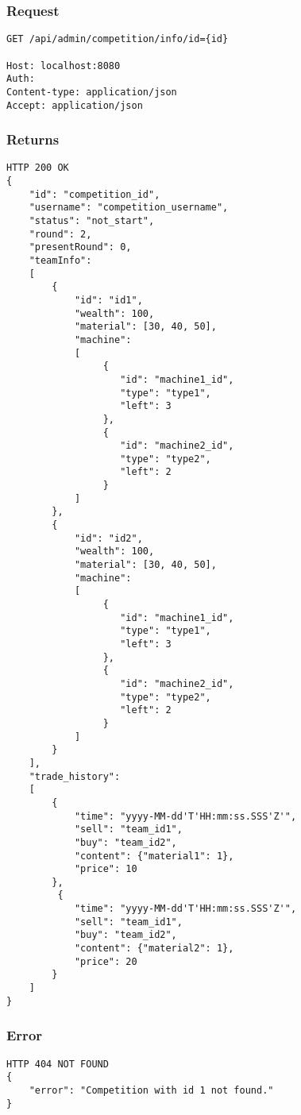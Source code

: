 \documentclass{article}
\begin{document}
\subsubsection*{Request}
\begin{lstlisting}
GET /api/admin/competition/info/id={id}

Host: localhost:8080
Auth:
Content-type: application/json
Accept: application/json
\end{lstlisting}

\subsubsection*{Returns}
\begin{lstlisting}
HTTP 200 OK
{
    "id": "competition_id",
    "username": "competition_username",
    "status": "not_start",
    "round": 2,
    "presentRound": 0,
    "teamInfo":
    [
        {
            "id": "id1",
            "wealth": 100,
            "material": [30, 40, 50],
            "machine":
            [
                 {
                    "id": "machine1_id",
                    "type": "type1",
                    "left": 3
                 },
                 {
                    "id": "machine2_id",
                    "type": "type2",
                    "left": 2
                 }
            ]
        },
        {
            "id": "id2",
            "wealth": 100,
            "material": [30, 40, 50],
            "machine":
            [
                 {
                    "id": "machine1_id",
                    "type": "type1",
                    "left": 3
                 },
                 {
                    "id": "machine2_id",
                    "type": "type2",
                    "left": 2
                 }
            ]
        }
    ],
    "trade_history":
    [
        {
            "time": "yyyy-MM-dd'T'HH:mm:ss.SSS'Z'",
            "sell": "team_id1",
            "buy": "team_id2",
            "content": {"material1": 1},
            "price": 10
        },
         {
            "time": "yyyy-MM-dd'T'HH:mm:ss.SSS'Z'",
            "sell": "team_id1",
            "buy": "team_id2",
            "content": {"material2": 1},
            "price": 20
        }
    ]
}

\end{lstlisting}

\subsubsection*{Error}
\begin{lstlisting}
HTTP 404 NOT FOUND
{
    "error": "Competition with id 1 not found."
}
\end{lstlisting}
\end{document}
